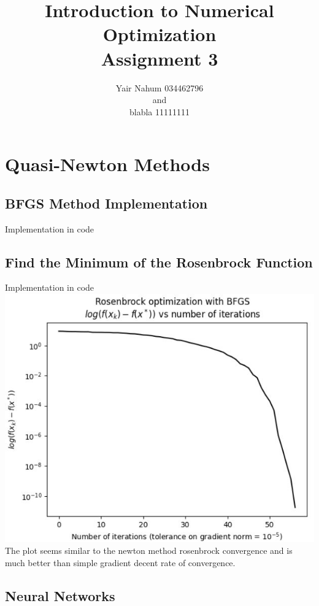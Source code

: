 \documentclass[12pt]{article}
\title{Introduction to Numerical Optimization\\Assignment 3}
\author{Yair Nahum 034462796\\and\\blabla 11111111 }
\begin{document}
\maketitle


\section{Quasi-Newton Methods}

\subsection{BFGS Method Implementation}
Implementation in code
\subsection{Find  the  Minimum  of  the  Rosenbrock  Function}
Implementation in code\\
\includegraphics{rosenbrock_BFGS_plot.JPG}\\
The plot seems similar to the newton method rosenbrock convergence and is much better than simple gradient decent rate of convergence. 
\subsection{Neural Networks}
\end{document}
